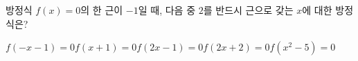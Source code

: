 방정식 $f(x)=0$의 한 근이 $-1$일 때, 다음 중 $2$를 반드시 근으로 갖는 $x$에 대한 방정식은?
\begin{choicesii}{$f(-x-1)=0$}{$f(x+1)=0$}{$f(2x-1)=0$}{$f(2x+2)=0$}{$f(x^2-5)=0$}\end{choicesii}
